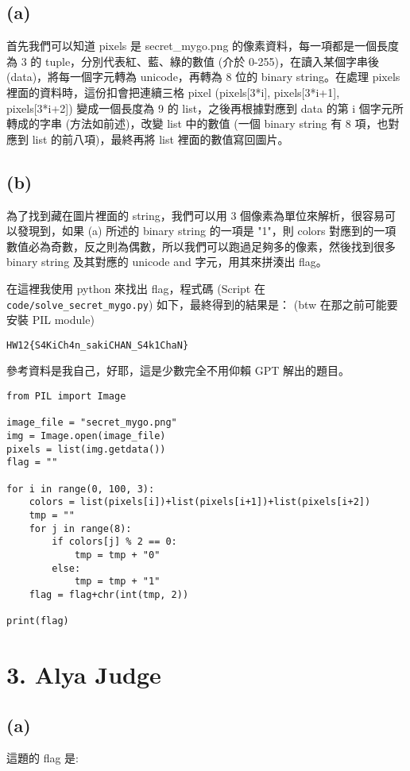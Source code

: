 \documentclass[12pt]{article}
\begin{document}
\subsection*{(a)}
首先我們可以知道 pixels 是 secret\_mygo.png 的像素資料，每一項都是一個長度為 3 的 tuple，分別代表紅、藍、綠的數值 (介於 0-255)，在讀入某個字串後 (data)，將每一個字元轉為 unicode，再轉為 8 位的 binary string。在處理 pixels 裡面的資料時，這份扣會把連續三格 pixel (pixels[3*i], pixels[3*i+1], pixels[3*i+2]) 變成一個長度為 9 的 list，之後再根據對應到 data 的第 i 個字元所轉成的字串 (方法如前述)，改變 list 中的數值 (一個 binary string 有 8 項，也對應到 list 的前八項)，最終再將 list 裡面的數值寫回圖片。
\subsection*{(b)}
為了找到藏在圖片裡面的 string，我們可以用 3 個像素為單位來解析，很容易可以發現到，如果 (a) 所述的 binary string 的一項是 "1"，則 colors 對應到的一項數值必為奇數，反之則為偶數，所以我們可以跑過足夠多的像素，然後找到很多 binary string 及其對應的 unicode and 字元，用其來拼湊出 flag。

在這裡我使用 python 來找出 flag，程式碼 (Script 在 \verb|code/solve_secret_mygo.py|) 如下，最終得到的結果是： (btw 在那之前可能要安裝 PIL module)

{\centering\verb|HW12{S4KiCh4n_sakiCHAN_S4k1ChaN}|\par}

參考資料是我自己，好耶，這是少數完全不用仰賴 GPT 解出的題目。
\begin{verbatim}
from PIL import Image

image_file = "secret_mygo.png"
img = Image.open(image_file)
pixels = list(img.getdata())
flag = ""

for i in range(0, 100, 3):
    colors = list(pixels[i])+list(pixels[i+1])+list(pixels[i+2])
    tmp = ""
    for j in range(8):
        if colors[j] % 2 == 0:
            tmp = tmp + "0"
        else:
            tmp = tmp + "1"
    flag = flag+chr(int(tmp, 2))

print(flag)
\end{verbatim}

\section*{3. Alya Judge}
\subsection*{(a)}
這題的 flag 是:
\end{document}
